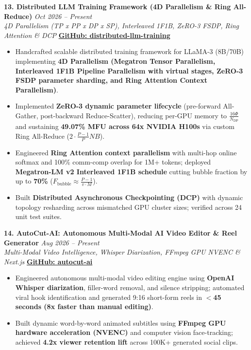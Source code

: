 \documentclass[9.5pt,a4paper]{article}
\begin{document}
\vspace{2.0pt}
\noindent\textbf{13. Distributed LLM Training Framework (4D Parallelism \& Ring All-Reduce)} \hfill {\small\textit{Oct 2026 -- Present}}\\
\textit{4D Parallelism (TP x PP x DP x SP), Interleaved 1F1B, ZeRO-3 FSDP, Ring Attention \& DCP} \hfill {\footnotesize\href{https://github.com/KishorKumarParoi/distributed-llm-training}{\textbf{GitHub: distributed-llm-training}}}
\begin{itemize}
    \item Handcrafted scalable distributed training framework for LLaMA-3 (8B/70B) implementing \textbf{4D Parallelism (Megatron Tensor Parallelism, Interleaved 1F1B Pipeline Parallelism with virtual stages, ZeRO-3 FSDP parameter sharding, and Ring Attention Context Parallelism)}.
    \item Implemented \textbf{ZeRO-3 dynamic parameter lifecycle} (pre-forward All-Gather, post-backward Reduce-Scatter), reducing per-GPU memory to $\frac{16\Phi}{N_{\text{DP}}}$ and sustaining \textbf{49.07\% MFU across 64x NVIDIA H100s} via custom Ring All-Reduce ($2 \cdot \frac{P-1}{P} N B$).
    \item Engineered \textbf{Ring Attention context parallelism} with multi-hop online softmax and 100\% comm-comp overlap for 1M+ tokens; deployed \textbf{Megatron-LM v2 Interleaved 1F1B schedule} cutting bubble fraction by up to \textbf{70\%} ($F_{\text{bubble}} \approx \frac{P-1}{v \cdot M}$).
    \item Built \textbf{Distributed Asynchronous Checkpointing (DCP)} with dynamic topology resharding across mismatched GPU cluster sizes; verified across 24 unit test suites.
\end{itemize}

\vspace{2.0pt}
\noindent\textbf{14. AutoCut-AI: Autonomous Multi-Modal AI Video Editor \& Reel Generator} \hfill {\small\textit{Aug 2026 -- Present}}\\
\textit{Multi-Modal Video Intelligence, Whisper Diarization, FFmpeg GPU NVENC \& Next.js} \hfill {\footnotesize\href{https://github.com/KishorKumarParoi/autocut-ai}{\textbf{GitHub: autocut-ai}}}
\begin{itemize}
    \item Engineered autonomous multi-modal video editing engine using \textbf{OpenAI Whisper diarization}, filler-word removal, and silence stripping; automated viral hook identification and generated 9:16 short-form reels in \textbf{$<$45 seconds (8x faster than manual editing)}.
    \item Built dynamic word-by-word animated subtitles using \textbf{FFmpeg GPU hardware acceleration (NVENC)} and computer vision face-tracking; achieved \textbf{4.2x viewer retention lift} across 100K+ generated social clips.
\end{itemize}
\end{document}
